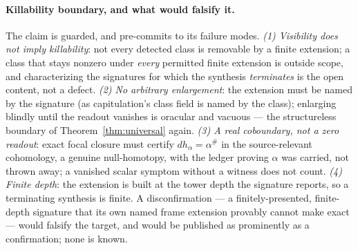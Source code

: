 \documentclass[11pt]{article}
\theoremstyle{definition}
\begin{document}
\paragraph{Killability boundary, and what would falsify it.} The claim is guarded, and pre-commits to its failure
modes. \emph{(1) Visibility does not imply killability}: not every detected class is removable by a finite
extension; a class that stays nonzero under \emph{every} permitted finite extension is outside scope, and
characterizing the signatures for which the synthesis \emph{terminates} is the open content, not a defect.
\emph{(2) No arbitrary enlargement}: the extension must be named by the signature (as capitulation's class field
is named by the class); enlarging blindly until the readout vanishes is oracular and vacuous --- the
structureless boundary of Theorem~\ref{thm:universal} again. \emph{(3) A real coboundary, not a zero readout}:
exact focal closure must certify $d h_\alpha=\alpha^\#$ in the source-relevant cohomology, a genuine
null-homotopy, with the ledger proving $\alpha$ was carried, not thrown away; a vanished scalar symptom without a
witness does not count. \emph{(4) Finite depth}: the extension is built at the tower depth the signature reports,
so a terminating synthesis is finite. A disconfirmation --- a finitely-presented, finite-depth signature that its
own named frame extension provably cannot make exact --- would falsify the target, and would be published as
prominently as a confirmation; none is known.
\end{document}
